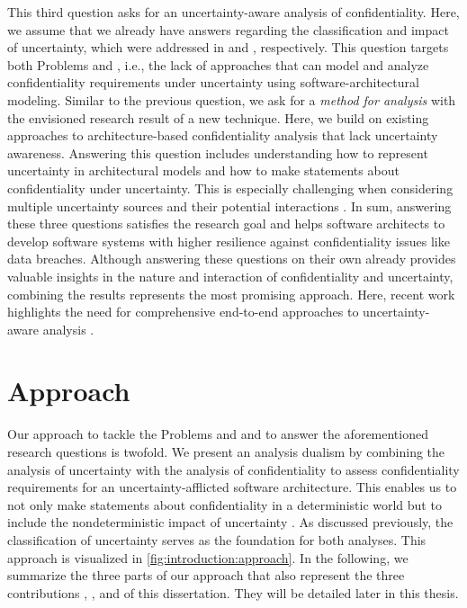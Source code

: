 This third question asks for an uncertainty-aware analysis of confidentiality. 
Here, we assume that we already have answers regarding the classification and impact of uncertainty, which were addressed in  and , respectively.
This question targets both Problems  and , i.e., the lack of approaches that can model and analyze confidentiality requirements under uncertainty using software-architectural modeling.
Similar to the previous question, we ask for a \emph{method for analysis} \cite{shaw_what_2002} with the envisioned research result of a new technique.
Here, we build on existing approaches to architecture-based confidentiality analysis \cite{walter_context-based_2023,seifermann_architectural_2022} that lack uncertainty awareness.
Answering this question includes understanding how to represent uncertainty in architectural models and how to make statements about confidentiality under uncertainty.
This is especially challenging when considering multiple uncertainty sources and their potential interactions \cite{camara_uncertainty_2022}.
In sum, answering these three questions satisfies the research goal and helps software architects to develop software systems with higher resilience against confidentiality issues like data breaches.
Although answering these questions on their own already provides valuable insights in the nature and interaction of confidentiality and uncertainty, combining the results represents the most promising approach.
Here, recent work highlights the need for comprehensive end-to-end approaches to uncertainty-aware analysis \cite{weyns_towards_2023}.





\section{Approach}%
\label{sec:introduction:approach}

Our approach to tackle the Problems  and  and to answer the aforementioned research questions is twofold. 
We present an analysis dualism by combining the analysis of uncertainty with the analysis of confidentiality to assess confidentiality requirements for an uncertainty-afflicted software architecture.
This enables us to not only make statements about confidentiality in a deterministic world but to include the nondeterministic impact of uncertainty \cite{walker_defining_2003}.
As discussed previously, the classification of uncertainty serves as the foundation for both analyses.
This approach is visualized in \autoref{fig:introduction:approach}.
In the following, we summarize the three parts of our approach that also represent the three contributions , , and  of this dissertation.
They will be detailed later in this thesis.

